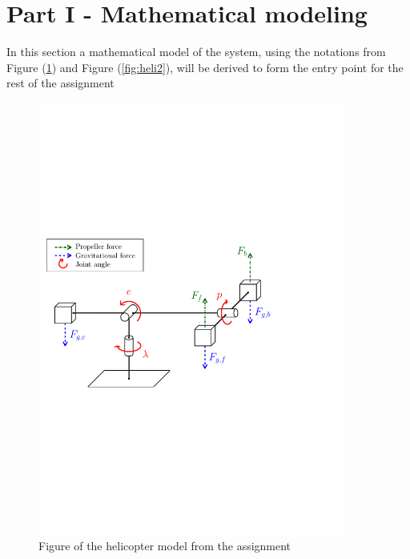 \section{Part I -  Mathematical modeling}

In this section a mathematical model of the system, using the notations from Figure (\ref{fig:heli}) and Figure (\ref{fig:heli2}), will be derived to form the entry point for the rest of the assignment

\begin{figure}[H]
	\centering
	\includegraphics[width=0.9\textwidth]{figures/forces.pdf}
	\caption{Figure of the helicopter model from the assignment }
\label{fig:heli}
\end{figure}

